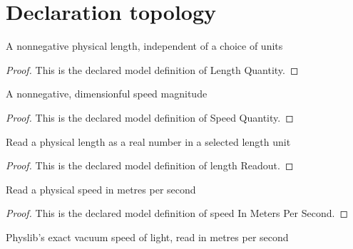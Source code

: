 \section{Declaration topology}
\begin{definition}
  \label{def:physics:phyx-mini-0608:phyxminiproblems-problemphyxmini0608-lengthquantity}
  A nonnegative physical length, independent of a choice of units
\end{definition}
\begin{proof}
  This is the declared model definition of Length Quantity.
\end{proof}
\begin{definition}
  \label{def:physics:phyx-mini-0608:phyxminiproblems-problemphyxmini0608-speedquantity}
  A nonnegative, dimensionful speed magnitude
\end{definition}
\begin{proof}
  This is the declared model definition of Speed Quantity.
\end{proof}
\begin{definition}
  \label{def:physics:phyx-mini-0608:phyxminiproblems-problemphyxmini0608-lengthreadout}
  Read a physical length as a real number in a selected length unit
\end{definition}
\begin{proof}
  This is the declared model definition of length Readout.
\end{proof}
\begin{definition}
  \label{def:physics:phyx-mini-0608:phyxminiproblems-problemphyxmini0608-speedinmeterspersecond}
  Read a physical speed in metres per second
\end{definition}
\begin{proof}
  This is the declared model definition of speed In Meters Per Second.
\end{proof}
\begin{definition}
  \label{def:physics:phyx-mini-0608:phyxminiproblems-problemphyxmini0608-vacuumspeedoflightinmeterspersecond}
  Physlib's exact vacuum speed of light, read in metres per second
\end{definition}
